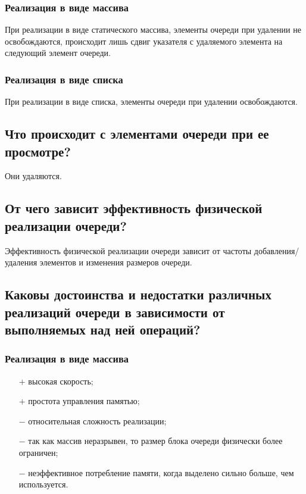 \documentclass[a4paper,12pt]{extarticle}
\begin{document}
\subsubsection{Реализация в виде массива}
При реализации в виде статического массива, элементы очереди при удалении не освобождаются, происходит лишь сдвиг указателя с удаляемого элемента на следующий элемент очереди.

\subsubsection{Реализация в виде списка}
При реализации в виде списка, элементы очереди при удалении освобождаются.


\subsection{Что происходит с элементами очереди при ее просмотре?}

Они удаляются.

\subsection{От чего зависит эффективность физической реализации очереди?}

Эффективность физической реализации очереди зависит от частоты добавления/удаления элементов и изменения размеров очереди.

\subsection{Каковы достоинства и недостатки различных реализаций очереди в зависимости от выполняемых над ней операций?}

\subsubsection{Реализация в виде массива}
\begin{itemize}
	\item[$+$] высокая скорость;
	\item[$+$] простота управления памятью;
	\item[$-$] относительная сложность реализации;
	\item[$-$] так как массив неразрывен, то размер блока очереди физически более ограничен;
	\item[$-$] неэффективное потребление памяти, когда выделено сильно больше, чем используется.
\end{itemize}
\end{document}
